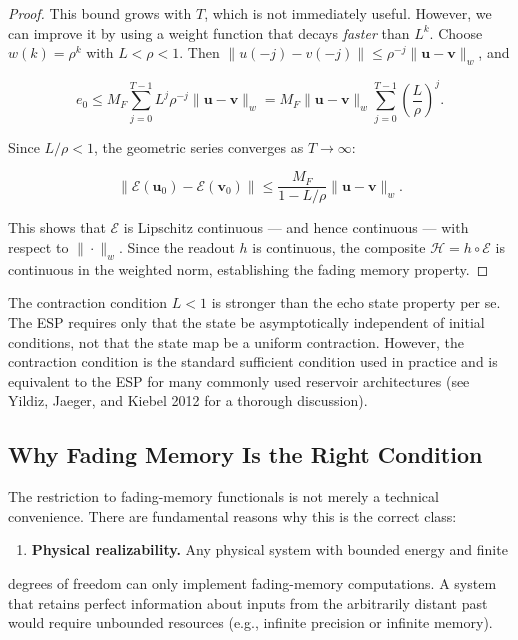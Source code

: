 \begin{proof}
This bound grows with $T$, which is not immediately useful. However, we can improve
it by using a weight function that decays \textit{faster} than $L^k$. Choose $w(k) = \rho^k$
with $L < \rho < 1$. Then $\|u(-j) - v(-j)\| \leq \rho^{-j}\|\mathbf{u} - \mathbf{v}\|_w$,
and

\[
e_0 \leq M_F \sum_{j=0}^{T-1} L^j \rho^{-j} \|\mathbf{u} - \mathbf{v}\|_w = M_F \|\mathbf{u} - \mathbf{v}\|_w \sum_{j=0}^{T-1} \left(\frac{L}{\rho}\right)^j.
\]

Since $L/\rho < 1$, the geometric series converges as $T \to \infty$:

\[
\|\mathcal{E}(\mathbf{u}_0) - \mathcal{E}(\mathbf{v}_0)\| \leq \frac{M_F}{1 - L/\rho}\|\mathbf{u} - \mathbf{v}\|_w.
\]

This shows that $\mathcal{E}$ is Lipschitz continuous --- and hence continuous --- with respect to $\|\cdot\|_w$. Since the readout $h$ is continuous, the composite
$\mathcal{H} = h \circ \mathcal{E}$ is continuous in the weighted norm, establishing the
fading memory property.
\end{proof}


\begin{remark}
The contraction condition $L < 1$ is stronger than the echo state
property per se. The ESP requires only that the state be asymptotically independent
of initial conditions, not that the state map be a uniform contraction. However, the
contraction condition is the standard sufficient condition used in practice and is
equivalent to the ESP for many commonly used reservoir architectures (see Yildiz,
Jaeger, and Kiebel 2012 for a thorough discussion).
\end{remark}


\subsection{Why Fading Memory Is the Right Condition}\label{sec:15.2.3}

The restriction to fading-memory functionals is not merely a technical convenience.
There are fundamental reasons why this is the correct class:

\begin{enumerate}[nosep]
  \item \textbf{Physical realizability.} Any physical system with bounded energy and finite
\end{enumerate}
   degrees of freedom can only implement fading-memory computations. A system that
   retains perfect information about inputs from the arbitrarily distant past would
   require unbounded resources (e.g., infinite precision or infinite memory).

